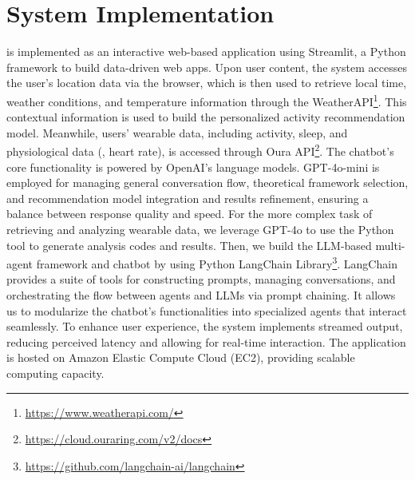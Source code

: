 \section{System Implementation}\label{sec.sys_implementation}
\name{} is implemented as an interactive web-based application using Streamlit, a Python framework to build data-driven web apps.
Upon user content, the system accesses the user's location data via the browser, which is then used to retrieve local time, weather conditions, and temperature information through the WeatherAPI\footnote{\url{https://www.weatherapi.com/}}. 
This contextual information is used to build the personalized activity recommendation model.
Meanwhile, users' wearable data, including activity, sleep, and physiological data (\eg, heart rate), is accessed through Oura API\footnote{\url{https://cloud.ouraring.com/v2/docs}}.
The chatbot's core functionality is powered by OpenAI's language models. 
GPT-4o-mini is employed for managing general conversation flow, theoretical framework selection, and recommendation model integration and results refinement, ensuring a balance between response quality and speed. 
For the more complex task of retrieving and analyzing wearable data, we leverage GPT-4o to use the Python tool to generate analysis codes and results.
Then, we build the LLM-based multi-agent framework and chatbot by using Python LangChain Library\footnote{\url{https://github.com/langchain-ai/langchain}}. LangChain provides a suite of tools for constructing prompts, managing conversations, and orchestrating the flow between agents and LLMs via prompt chaining. It allows us to modularize the chatbot's functionalities into specialized agents that interact seamlessly.
To enhance user experience, the system implements streamed output, reducing perceived latency and allowing for real-time interaction.
The application is hosted on Amazon Elastic Compute Cloud (EC2), providing scalable computing capacity. 

